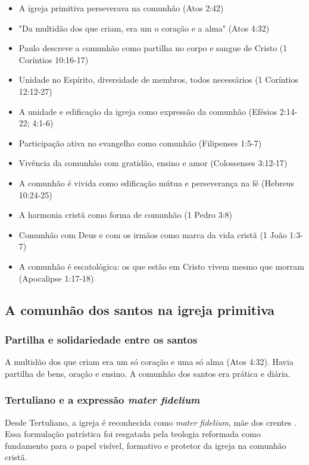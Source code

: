 \begin{itemize}
\item A igreja primitiva perseverava na comunhão (Atos 2:42)
\item "Da multidão dos que criam, era um o coração e a alma" (Atos 4:32)
\item Paulo descreve a comunhão como partilha no corpo e sangue de Cristo (1 Coríntios 10:16-17)
\item Unidade no Espírito, diversidade de membros, todos necessários (1 Coríntios 12:12-27)
\item A unidade e edificação da igreja como expressão da comunhão (Efésios 2:14-22; 4:1-6)
\item Participação ativa no evangelho como comunhão (Filipenses 1:5-7)
\item Vivência da comunhão com gratidão, ensino e amor (Colossenses 3:12-17)
\item A comunhão é vivida como edificação mútua e perseverança na fé (Hebreus 10:24-25)
\item A harmonia cristã como forma de comunhão (1 Pedro 3:8)
\item Comunhão com Deus e com os irmãos como marca da vida cristã (1 João 1:3-7)
\item A comunhão é escatológica: os que estão em Cristo vivem mesmo que morram (Apocalipse 1:17-18)
\end{itemize}

\subsection{A comunhão dos santos na igreja primitiva}

\subsubsection{Partilha e solidariedade entre os santos}
A multidão dos que criam era um só coração e uma só alma (Atos 4:32). Havia partilha de bens, oração e ensino. A comunhão dos santos era prática e diária.

\subsubsection{Tertuliano e a expressão \textit{mater fidelium}}
Desde Tertuliano, a igreja é reconhecida como \textit{mater fidelium}, mãe dos crentes \cite{bavinck2012}. Essa formulação patrística foi resgatada pela teologia reformada como fundamento para o papel visível, formativo e protetor da igreja na comunhão cristã.

